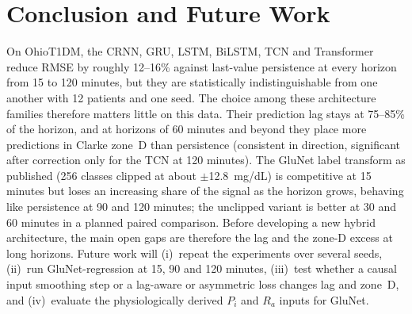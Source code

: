 \documentclass[conference]{IEEEtran}
\begin{document}
\section{Conclusion and Future Work}
On OhioT1DM, the CRNN, GRU, LSTM, BiLSTM, TCN and Transformer reduce RMSE by roughly 12--16\% against last-value persistence at every horizon from 15 to 120 minutes, but they are statistically indistinguishable from one another with 12 patients and one seed. The choice among these architecture families therefore matters little on this data. Their prediction lag stays at 75--85\% of the horizon, and at horizons of 60 minutes and beyond they place more predictions in Clarke zone~D than persistence (consistent in direction, significant after correction only for the TCN at 120 minutes). The GluNet label transform as published (256 classes clipped at about $\pm$12.8~mg/dL) is competitive at 15 minutes but loses an increasing share of the signal as the horizon grows, behaving like persistence at 90 and 120 minutes; the unclipped variant is better at 30 and 60 minutes in a planned paired comparison. Before developing a new hybrid architecture, the main open gaps are therefore the lag and the zone-D excess at long horizons. Future work will (i)~repeat the experiments over several seeds, (ii)~run GluNet-regression at 15, 90 and 120 minutes, (iii)~test whether a causal input smoothing step or a lag-aware or asymmetric loss changes lag and zone~D, and (iv)~evaluate the physiologically derived $P_i$ and $R_a$ inputs for GluNet.
\end{document}
